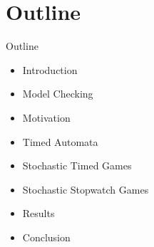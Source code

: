 \documentclass{beamer}
\begin{document}
  \section{Outline}
  \begin{frame}{Outline}
  \begin{itemize}
      \item Introduction
      \item  Model Checking
      \item Motivation
      \item Timed Automata
      \item Stochastic Timed Games
      \item Stochastic Stopwatch Games
      \item Results
      \item Conclusion
  \end{itemize}
  \end{frame}
\end{document}
